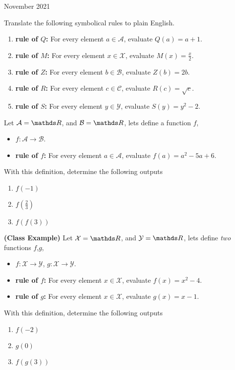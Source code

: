 \documentclass[12pt,oneside]{book} %
\begin{document}
\begin{lec}{November 2021}
	\begin{ex}
		Translate the following symbolical rules to plain English.
		\begin{enumerate}[label=(\alph*)]
			\item \textbf{rule of $Q$:} For every element $a\in \mathcal{A}$, evaluate $Q(a) = a + 1$.
			\item \textbf{rule of $M$:} For every element $x\in \mathcal{X}$, evaluate $M(x) = \frac{x}{2}$.
			\item \textbf{rule of $Z$:} For every element $b\in \mathcal{B}$, evaluate  $Z(b) = 2b$.
			\item \textbf{rule of $R$:} For every element $c\in \mathcal{C}$, evaluate $R(c) = \sqrt{c} $.
			\item \textbf{rule of $S$:} For every element $y\in \mathcal{Y}$, evaluate $S(y) = y^2 - 2$.
		\end{enumerate}
	\end{ex}
	
	\begin{ex}
		Let $\mathcal{A} = \R$, and $\mathcal{B} = \R$, lets define a function $f$,
		\begin{itemize}
			\item $f \colon \mathcal{A} \to \mathcal{B}$.
			\item \textbf{rule of $f$:} For every element $a\in \mathcal{A}$, evaluate $f(a) = a^2 - 5a + 6$.
		\end{itemize}
		With this definition, determine the following outputs
		\begin{enumerate}[label=(\alph*)]
			\item $f(-1)$
			\item $f(\frac{2}{3})$
			\item $f(f(3))$
		\end{enumerate}
	\end{ex}

	\begin{ex}
		\textbf{(Class Example)} Let $\mathcal{X} = \R$, and $\mathcal{Y} = \R$, lets define \emph{two} functions $f$,$g$,
		\begin{itemize}
		\item $f \colon \mathcal{X} \to \mathcal{Y}$, $g \colon \mathcal{X} \to \mathcal{Y}$.
		\item \textbf{rule of $f$:} For every element $x\in \mathcal{X}$, evaluate $f(x) = x^2 - 4 $.
		\item \textbf{rule of $g$:} For every element $x\in \mathcal{X}$, evaluate $g(x) = x - 1$.
		\end{itemize}
		With this definition, determine the following outputs
		\begin{enumerate}[label=(\alph*)]
			\item $f(-2)$
			\item $g(0)$
			\item $f(g(3))$
		\end{enumerate}
	\end{ex}


\end{lec}
\end{document}
